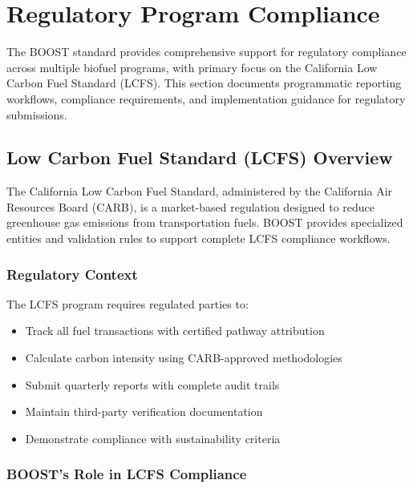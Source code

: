 
\section{Regulatory Program Compliance}
\label{sec:regulatory-compliance}

The BOOST standard provides comprehensive support for regulatory compliance across multiple biofuel programs, with primary focus on the California Low Carbon Fuel Standard (LCFS). This section documents programmatic reporting workflows, compliance requirements, and implementation guidance for regulatory submissions.

\subsection{Low Carbon Fuel Standard (LCFS) Overview}
\label{sec:lcfs-overview}

The California Low Carbon Fuel Standard, administered by the California Air Resources Board (CARB), is a market-based regulation designed to reduce greenhouse gas emissions from transportation fuels. BOOST provides specialized entities and validation rules to support complete LCFS compliance workflows.

\subsubsection{Regulatory Context}

The LCFS program requires regulated parties to:
\begin{itemize}
    \item Track all fuel transactions with certified pathway attribution
    \item Calculate carbon intensity using CARB-approved methodologies
    \item Submit quarterly reports with complete audit trails
    \item Maintain third-party verification documentation
    \item Demonstrate compliance with sustainability criteria
\end{itemize}

\subsubsection{BOOST's Role in LCFS Compliance}

